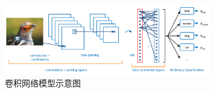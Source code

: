 \begin{figure}
	\centering
	\includegraphics[width=0.8\textwidth]{demo_images/CNN}
	\caption{卷积网络模型示意图}
	\label{fig:network1}
\end{figure}